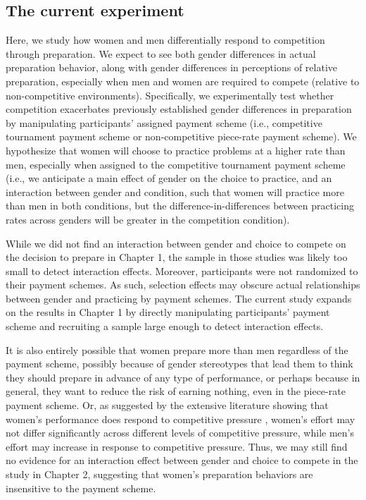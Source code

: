 \documentclass[a4paper, nobind]{templates/ociamthesis}
\begin{document}
\hypertarget{the-current-experiment}{%
\subsection{The current experiment}\label{the-current-experiment}}

Here, we study how women and men differentially respond to competition through preparation. We expect to see both gender differences in actual preparation behavior, along with gender differences in perceptions of relative preparation, especially when men and women are required to compete (relative to non-competitive environments). Specifically, we experimentally test whether competition exacerbates previously established gender differences in preparation by manipulating participants' assigned payment scheme (i.e., competitive tournament payment scheme or non-competitive piece-rate payment scheme). We hypothesize that women will choose to practice problems at a higher rate than men, especially when assigned to the competitive tournament payment scheme (i.e., we anticipate a main effect of gender on the choice to practice, and an interaction between gender and condition, such that women will practice more than men in both conditions, but the difference-in-differences between practicing rates across genders will be greater in the competition condition).

While we did not find an interaction between gender and choice to compete on the decision to prepare in Chapter 1, the sample in those studies was likely too small to detect interaction effects. Moreover, participants were not randomized to their payment schemes. As such, selection effects may obscure actual relationships between gender and practicing by payment schemes. The current study expands on the results in Chapter 1 by directly manipulating participants' payment scheme and recruiting a sample large enough to detect interaction effects.

It is also entirely possible that women prepare more than men regardless of the payment scheme, possibly because of gender stereotypes that lead them to think they should prepare in advance of any type of performance, or perhaps because in general, they want to reduce the risk of earning nothing, even in the piece-rate payment scheme. Or, as suggested by the extensive literature showing that women's performance does respond to competitive pressure \autocite{Gneezy2003,Gneezy2004,Gunther2010,Samak2013,Booth2022,Gneezy2004,Niederle2011,Cotton2013}, women's effort may not differ significantly across different levels of competitive pressure, while men's effort may increase in response to competitive pressure. Thus, we may still find no evidence for an interaction effect between gender and choice to compete in the study in Chapter 2, suggesting that women's preparation behaviors are insensitive to the payment scheme.
\end{document}
